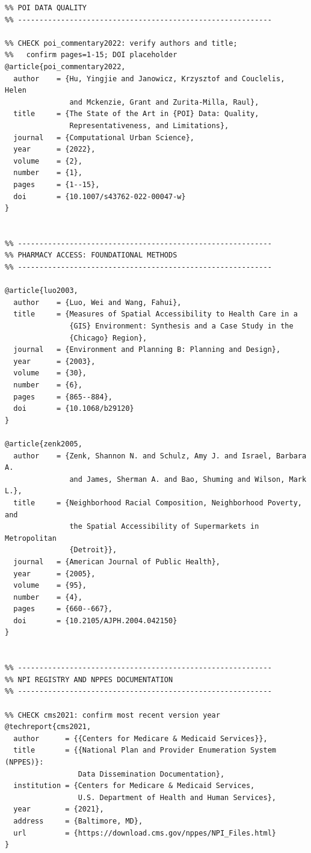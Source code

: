 \documentclass[12pt]{article}
\begin{document}
\begin{Verbatim}[fontsize=\small, xleftmargin=0.2in, breaklines=true, breakanywhere=true]
%% -----------------------------------------------------------
%% POI DATA QUALITY
%% -----------------------------------------------------------

%% CHECK poi_commentary2022: verify authors and title;
%%   confirm pages=1-15; DOI placeholder
@article{poi_commentary2022,
  author    = {Hu, Yingjie and Janowicz, Krzysztof and Couclelis, Helen
               and Mckenzie, Grant and Zurita-Milla, Raul},
  title     = {The State of the Art in {POI} Data: Quality,
               Representativeness, and Limitations},
  journal   = {Computational Urban Science},
  year      = {2022},
  volume    = {2},
  number    = {1},
  pages     = {1--15},
  doi       = {10.1007/s43762-022-00047-w}
}


%% -----------------------------------------------------------
%% PHARMACY ACCESS: FOUNDATIONAL METHODS
%% -----------------------------------------------------------

@article{luo2003,
  author    = {Luo, Wei and Wang, Fahui},
  title     = {Measures of Spatial Accessibility to Health Care in a
               {GIS} Environment: Synthesis and a Case Study in the
               {Chicago} Region},
  journal   = {Environment and Planning B: Planning and Design},
  year      = {2003},
  volume    = {30},
  number    = {6},
  pages     = {865--884},
  doi       = {10.1068/b29120}
}

@article{zenk2005,
  author    = {Zenk, Shannon N. and Schulz, Amy J. and Israel, Barbara A.
               and James, Sherman A. and Bao, Shuming and Wilson, Mark L.},
  title     = {Neighborhood Racial Composition, Neighborhood Poverty, and
               the Spatial Accessibility of Supermarkets in Metropolitan
               {Detroit}},
  journal   = {American Journal of Public Health},
  year      = {2005},
  volume    = {95},
  number    = {4},
  pages     = {660--667},
  doi       = {10.2105/AJPH.2004.042150}
}


%% -----------------------------------------------------------
%% NPI REGISTRY AND NPPES DOCUMENTATION
%% -----------------------------------------------------------

%% CHECK cms2021: confirm most recent version year
@techreport{cms2021,
  author      = {{Centers for Medicare & Medicaid Services}},
  title       = {{National Plan and Provider Enumeration System (NPPES)}:
                 Data Dissemination Documentation},
  institution = {Centers for Medicare & Medicaid Services,
                 U.S. Department of Health and Human Services},
  year        = {2021},
  address     = {Baltimore, MD},
  url         = {https://download.cms.gov/nppes/NPI_Files.html}
}
\end{Verbatim}
\end{document}
